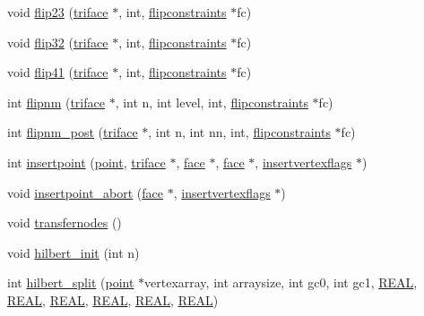 \begin{DoxyCompactItemize}
\item 
void \hyperlink{classtetgenmesh_a134475b2c7d8269686cf3d7fbe11183d}{flip23} (\hyperlink{classtetgenmesh_1_1triface}{triface} $\ast$, int, \hyperlink{classtetgenmesh_1_1flipconstraints}{flipconstraints} $\ast$fc)
\item 
void \hyperlink{classtetgenmesh_a42d0630c17e609dc3224975693a992c4}{flip32} (\hyperlink{classtetgenmesh_1_1triface}{triface} $\ast$, int, \hyperlink{classtetgenmesh_1_1flipconstraints}{flipconstraints} $\ast$fc)
\item 
void \hyperlink{classtetgenmesh_a061a1d2f047d12726215eac51c7bb5a1}{flip41} (\hyperlink{classtetgenmesh_1_1triface}{triface} $\ast$, int, \hyperlink{classtetgenmesh_1_1flipconstraints}{flipconstraints} $\ast$fc)
\item 
int \hyperlink{classtetgenmesh_aab593bf52c98bf0315b39afc65c06312}{flipnm} (\hyperlink{classtetgenmesh_1_1triface}{triface} $\ast$, int n, int level, int, \hyperlink{classtetgenmesh_1_1flipconstraints}{flipconstraints} $\ast$fc)
\item 
int \hyperlink{classtetgenmesh_ac77db19e27c38b0ddace0482ffbd28a0}{flipnm\+\_\+post} (\hyperlink{classtetgenmesh_1_1triface}{triface} $\ast$, int n, int nn, int, \hyperlink{classtetgenmesh_1_1flipconstraints}{flipconstraints} $\ast$fc)
\item 
int \hyperlink{classtetgenmesh_a5d85611ca91db181e357457beb13a633}{insertpoint} (\hyperlink{classtetgenmesh_ace3fb4f80389185b7c9b18ab69a3dea2}{point}, \hyperlink{classtetgenmesh_1_1triface}{triface} $\ast$, \hyperlink{classtetgenmesh_1_1face}{face} $\ast$, \hyperlink{classtetgenmesh_1_1face}{face} $\ast$, \hyperlink{classtetgenmesh_1_1insertvertexflags}{insertvertexflags} $\ast$)
\item 
void \hyperlink{classtetgenmesh_ac7173aaaeb5600daa685af9c2c718834}{insertpoint\+\_\+abort} (\hyperlink{classtetgenmesh_1_1face}{face} $\ast$, \hyperlink{classtetgenmesh_1_1insertvertexflags}{insertvertexflags} $\ast$)
\item 
void \hyperlink{classtetgenmesh_aca4cdd18ce8662d83d00f3be302e594d}{transfernodes} ()
\item 
void \hyperlink{classtetgenmesh_a5b84bd9ae3b1797a1e11730b23c1a2c0}{hilbert\+\_\+init} (int n)
\item 
int \hyperlink{classtetgenmesh_a11227c742897ec6e617a82dc61fc460d}{hilbert\+\_\+split} (\hyperlink{classtetgenmesh_ace3fb4f80389185b7c9b18ab69a3dea2}{point} $\ast$vertexarray, int arraysize, int gc0, int gc1, \hyperlink{tetgen_8h_a4b654506f18b8bfd61ad2a29a7e38c25}{R\+E\+AL}, \hyperlink{tetgen_8h_a4b654506f18b8bfd61ad2a29a7e38c25}{R\+E\+AL}, \hyperlink{tetgen_8h_a4b654506f18b8bfd61ad2a29a7e38c25}{R\+E\+AL}, \hyperlink{tetgen_8h_a4b654506f18b8bfd61ad2a29a7e38c25}{R\+E\+AL}, \hyperlink{tetgen_8h_a4b654506f18b8bfd61ad2a29a7e38c25}{R\+E\+AL}, \hyperlink{tetgen_8h_a4b654506f18b8bfd61ad2a29a7e38c25}{R\+E\+AL})

\end{DoxyCompactItemize}

